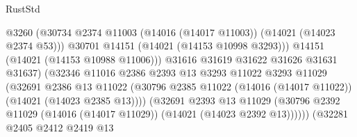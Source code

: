\begin{lexlean}{RustStd}
\begin{coremodule}
                                              @3260
                                              (@30734
                                                @2374
                                                @11003
                                                (@14016 (@14017 @11003))
                                                (@14021 (@14023 @2374 @53)))
                                              @30701
                                              @14151
                                              (@14021 (@14153 @10998 @3293)))
                                            @14151
                                            (@14021 (@14153 @10988 @11006)))
                                          @31616
                                          @31619
                                          @31622
                                          @31626
                                          @31631
                                          @31637)
                                        (@32346
                                          @11016
                                          @2386
                                          @2393
                                          @13
                                          @3293
                                          @11022
                                          @3293
                                          @11029
                                          (@32691
                                            @2386
                                            @13
                                            @11022
                                            (@30796
                                              @2385
                                              @11022
                                              (@14016 (@14017 @11022))
                                              (@14021 (@14023 @2385 @13))))
                                          (@32691
                                            @2393
                                            @13
                                            @11029
                                            (@30796
                                              @2392
                                              @11029
                                              (@14016 (@14017 @11029))
                                              (@14021 (@14023 @2392 @13))))))
                                      (@32281
                                        @2405
                                        @2412
                                        @2419
                                        @13

\end{coremodule}
\end{lexlean}
